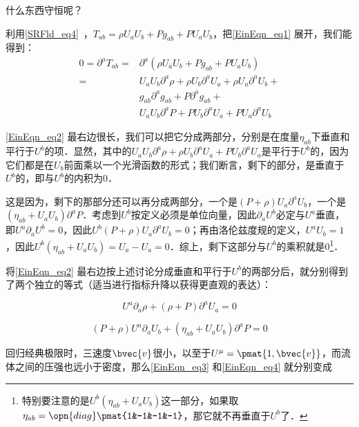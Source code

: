 什么东西守恒呢？

利用\autoref{SRFld_eq4}~，$T_{ab}=\rho U_aU_b+P g_{ab}+P U_aU_b$，把\autoref{EinEqn_eq1} 展开，我们能得到：
\begin{equation}\label{EinEqn_eq2}
\begin{aligned}
0=\partial^aT_{ab}=&\partial^a(\rho U_aU_b+P g_{ab}+P U_aU_b)\\
=&U_aU_b\partial^a\rho+\rho U_b\partial^aU_a+\rho U_a\partial^aU_b+\\
&g_{ab}\partial^ag_{ab}+P\partial^ag_{ab}+\\
&U_aU_b\partial^aP+P U_b\partial^aU_a+P U_a\partial^aU_b
\end{aligned}
\end{equation}

\autoref{EinEqn_eq2} 最右边很长，我们可以把它分成两部分，分别是在度量$\eta_{ab}$下垂直和平行于$U^b$的项．显然，其中的$U_aU_b\partial^a\rho+\rho U_b\partial^aU_a+P U_b\partial^aU_a$是平行于$U^b$的，因为它们都是在$U_b$前面乘以一个光滑函数的形式；我们断言，剩下的部分，是垂直于$U^b$的，即与$U^b$的内积为$0$．

这是因为，剩下的那部分还可以再分成两部分，一个是$(P+\rho)U_a\partial^aU_b$，一个是$(\eta_{ab}+U_aU_b)\partial^aP$．考虑到$U^b$按定义必须是单位向量，因此$\partial_aU^b$必定与$U^a$垂直，即$U^a\partial_aU^b=0$，因此$U^b(P+\rho)U_a\partial^aU_b=0$；再由洛伦兹度规的定义，$U^aU_b=1$，因此$U^b(\eta_{ab}+U_aU_b)=U_a-U_a=0$．综上，剩下这部分与$U^b$的乘积就是$0$\footnote{特别要注意的是$U^b(\eta_{ab}+U_aU_b)$这一部分，如果取$\eta_{ab}=\opn{diag}\pmat{1&-1&-1&-1}$，那它就不再垂直于$U^b$了．}．

将\autoref{EinEqn_eq2} 最右边按上述讨论分成垂直和平行于$U^b$的两部分后，就分别得到了两个独立的等式（适当进行指标升降以获得更直观的表达）：

\begin{equation}\label{EinEqn_eq3}
U^a\partial_a\rho+(\rho+P)\partial^aU_a=0
\end{equation}

\begin{equation}\label{EinEqn_eq4}
(P+\rho)U^a\partial_aU_b+(\eta_{ab}+U_aU_b)\partial^aP=0
\end{equation}

回归经典极限时，三速度$\bvec{v}$很小，以至于$U^\mu=\pmat{1, \bvec{v}}$，而流体之间的压强也远小于密度，那么\autoref{EinEqn_eq3} 和\autoref{EinEqn_eq4} 就分别变成












